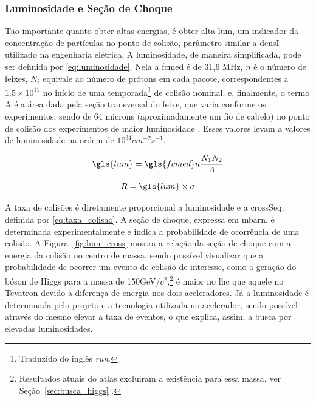 \subsubsection{Luminosidade e Seção de Choque}
\label{sssec:Lum_Crosseq}
Tão importante quanto obter altas energias, é obter alta
\gls{lum}, um indicador da concentração 
de partículas no ponto de colisão, parâmetro similar a \gls{densI} 
utilizado na engenharia elétrica. A luminosidade, de maneira
simplificada, pode ser definida por
\ref{eq:luminosidade}. Nela a \gls{fcmed} é de 31,6 MHz, $n$ é o número de feixes, 
$N_i$ equivale ao número de prótons em cada pacote, correspondentes a $1.5\times10^{11}$ 
no início de uma temporada\footnote{Traduzido do inglês \emph{run}.} de colisão nominal, e,
finalmente, o termo A é a área dada pela seção transversal do feixe, que varia
conforme os experimentos, sendo de 64 microns (aproximadamente um fio de cabelo) 
no ponto de colisão dos experimentos de maior luminosidade \cite{webLHC}. 
Esses valores levam a valores de luminosidade na ordem de
$10^{34}cm^{-2}s^{-1}$.


\begin{equation} \label{eq:luminosidade}
\gls{lum}=\gls{fcmed}n\frac{N_1 N_2}{A}
\end{equation}

\begin{equation}
R = \gls{lum} \times \sigma
\label{eq:taxa_colisao}
\end{equation}

A taxa de colisões é diretamente proporcional a luminosidade e a \gls{crossSeq}, 
definida por \ref{eq:taxa_colisao}. A seção de choque, expressa em mbarn, 
é determinada experimentalmente e indica a probabilidade de ocorrência de uma colisão. 
A Figura~\ref{fig:lum_cross} mostra a relação da seção de choque com a energia
da colisão no centro de massa, sendo possível visualizar que a probabilidade 
de ocorrer um evento de colisão de interesse, como a geração do
bóson de Higgs para a massa de 150GeV/$c^2$,\footnote{Resultados atuais do \gls{atlas} excluiram a
existência para essa massa, ver Seção~\ref{sec:busca_higgs} \cite{atlas_higgs}.} é maior no \gls{lhc} 
que aquele no Tevatron devido a diferença de energia nos dois aceleradores.
Já a luminosidade é determinada pelo projeto e a tecnologia utilizada no 
acelerador, sendo possível através do mesmo elevar a taxa de eventos, o que
explica, assim, a busca por elevadas luminosidades.

